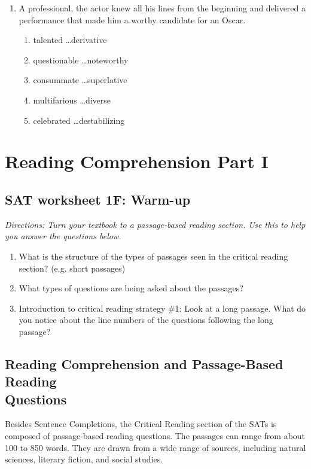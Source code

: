 \documentclass[12pt]{book}
\newcommand{\longline}{\underline{\hspace{2in}} }
\begin{document}
\begin{enumerate}
\bigskip
\item A \longline professional, the actor knew all his lines from the beginning and delivered a \longline performance that made him a worthy candidate for an Oscar.

\begin{enumerate}[label=(\Alph*)]
\item talented \ldots derivative
\item questionable \ldots noteworthy
\item consummate \ldots superlative
\item multifarious \ldots diverse
\item celebrated \ldots destabilizing
\end{enumerate}
\end{enumerate}

\chapter[Reading Comprehension]{Reading Comprehension Part I}
\section{SAT worksheet 1F: Warm-up}
\textit{Directions: Turn your textbook to a passage-based reading section. Use this to help you answer the questions below.}

\begin{enumerate}
\item What is the structure of the types of passages seen in the critical reading section? (e.g. short passages)
\vfill\item What types of questions are being asked about the passages?
\vfill\item Introduction to critical reading strategy \#1: Look at a long passage. What do you notice about the line numbers of the questions following the long passage?
\end{enumerate}

\vfill
\newpage
\section[Reading Questions]{Reading Comprehension and Passage-Based Reading\\ Questions}
Besides Sentence Completions, the Critical Reading section of the SATs is composed of passage-based reading questions.  The passages can range from about 100 to 850 words.  They are drawn from a wide range of sources, including natural sciences, literary fiction, and social studies.  
\end{document}
